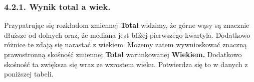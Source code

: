 \documentclass[
  letterpaper,
  DIV=11,
  numbers=noendperiod]{scrartcl}
\newenvironment{Shaded}{\begin{snugshade}}{\end{snugshade}}
\newcommand{\AttributeTok}[1]{\textcolor[rgb]{0.40,0.45,0.13}{#1}}
\newcommand{\FunctionTok}[1]{\textcolor[rgb]{0.28,0.35,0.67}{#1}}
\newcommand{\NormalTok}[1]{\textcolor[rgb]{0.00,0.23,0.31}{#1}}
\newcommand{\OtherTok}[1]{\textcolor[rgb]{0.00,0.23,0.31}{#1}}
\newcommand{\SpecialCharTok}[1]{\textcolor[rgb]{0.37,0.37,0.37}{#1}}
\begin{document}
\hypertarget{wynik-total-a-wiek.}{%
\subsubsection{4.2.1. Wynik total a wiek.}\label{wynik-total-a-wiek.}}

Przypatrując się rozkładom zmiennej \textbf{Total} widzimy, że górne
wąsy są znacznie dłuższe od dolnych oraz, że mediana jest bliżej
pierwszego kwartyla. Dodatkowo różnice te zdają się narastać z wiekiem.
Możemy zatem wywnioskować znaczną prawostronną skośność zmiennej
\textbf{Total} warunkowanej \textbf{Wiekiem.} Dodatkowo skośność ta
zwiększa się wraz ze wzrostem wieku. Potwierdza się to w danych z
poniższej tabeli.

\begin{Shaded}
\end{Shaded}
\end{document}
